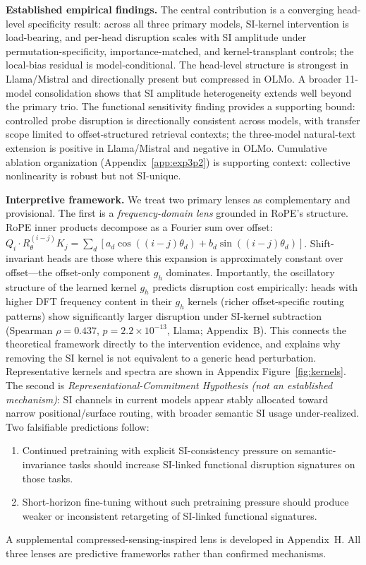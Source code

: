 \documentclass{article}
\begin{document}
\textbf{Established empirical findings.} The central contribution is a converging head-level specificity result: across all three primary models, SI-kernel intervention is load-bearing, and per-head disruption scales with SI amplitude under permutation-specificity, importance-matched, and kernel-transplant controls; the local-bias residual is model-conditional. The head-level structure is strongest in Llama/Mistral and directionally present but compressed in OLMo. A broader 11-model consolidation shows that SI amplitude heterogeneity extends well beyond the primary trio. The functional sensitivity finding provides a supporting bound: controlled probe disruption is directionally consistent across models, with transfer scope limited to offset-structured retrieval contexts; the three-model natural-text extension is positive in Llama/Mistral and negative in OLMo. Cumulative ablation organization (Appendix~\ref{app:exp3p2}) is supporting context: collective nonlinearity is robust but not SI-unique.

\textbf{Interpretive framework.} We treat two primary lenses as complementary and provisional. The first is a \textit{frequency-domain lens} grounded in RoPE's structure. RoPE inner products decompose as a Fourier sum over offset: $Q_i \cdot R_{\theta}^{(i-j)} K_j = \sum_d [a_d \cos((i{-}j)\theta_d) + b_d \sin((i{-}j)\theta_d)]$. Shift-invariant heads are those where this expansion is approximately constant over offset---the offset-only component $g_h$ dominates. Importantly, the oscillatory structure of the learned kernel $g_h$ predicts disruption cost empirically: heads with higher DFT frequency content in their $g_h$ kernels (richer offset-specific routing patterns) show significantly larger disruption under SI-kernel subtraction (Spearman $\rho{=}0.437$, $p{=}2.2\times10^{-13}$, Llama; Appendix~B). This connects the theoretical framework directly to the intervention evidence, and explains why removing the SI kernel is not equivalent to a generic head perturbation. Representative kernels and spectra are shown in Appendix Figure~\ref{fig:kernels}. The second is \textit{Representational-Commitment Hypothesis (not an established mechanism)}: SI channels in current models appear stably allocated toward narrow positional/surface routing, with broader semantic SI usage under-realized. Two falsifiable predictions follow:
\begin{enumerate}
\item Continued pretraining with explicit SI-consistency pressure on semantic-invariance tasks should increase SI-linked functional disruption signatures on those tasks.
\item Short-horizon fine-tuning without such pretraining pressure should produce weaker or inconsistent retargeting of SI-linked functional signatures.
\end{enumerate}
A supplemental compressed-sensing-inspired lens is developed in Appendix~H. All three lenses are predictive frameworks rather than confirmed mechanisms.
\end{document}
